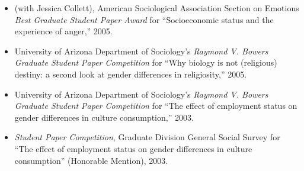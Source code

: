 \begin{itemize}[itemsep=0.5ex]
\item[--] (with Jessica Collett), American Sociological Association Section on Emotions  {\em Best Graduate Student Paper Award} for ``Socioeconomic status and the experience of anger,'' 2005.

\item[--] University of Arizona Department of Sociology's  {\em Raymond V. Bowers Graduate Student Paper Competition} for ``Why biology is not (religious) destiny: a second look at gender differences in religiosity,'' 2005.

\item[--] University of Arizona Department of Sociology's  {\em Raymond V. Bowers Graduate Student Paper Competition} for ``The effect of employment status on gender differences in culture consumption,'' 2003.

\item[--] {\em Student Paper Competition}, Graduate Division General Social Survey for ``The effect of employment status on gender differences in culture consumption'' (Honorable Mention), 2003.
\end{itemize}

